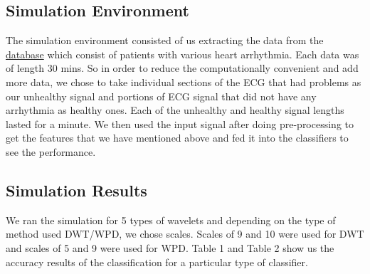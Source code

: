 \documentclass[10pt,twocolumn,letterpaper]{article}
\begin{document}
\subsection{Simulation Environment}
The simulation environment consisted of us extracting the data from the \href{https://physionet.org/content/mitdb/1.0.0/}{database} which consist of patients with various heart arrhythmia. Each data was of length 30 mins. So in order to reduce the computationally convenient and add more data, we chose to take individual sections of the ECG that had problems as our unhealthy signal and portions of ECG signal that did not have any arrhythmia as healthy ones. Each of the unhealthy and healthy signal lengths lasted for a minute. We then used the input signal after doing pre-processing to get the features that we have mentioned above and fed it into the classifiers to see the performance.

\subsection{Simulation Results} 
We ran the simulation for 5 types of wavelets and depending on the type of method used DWT/WPD, we chose scales. Scales of 9 and 10 were used for DWT and scales of 5 and 9 were used for WPD. Table 1 and Table 2 show us the accuracy results of the classification for a particular type of classifier.
\end{document}

